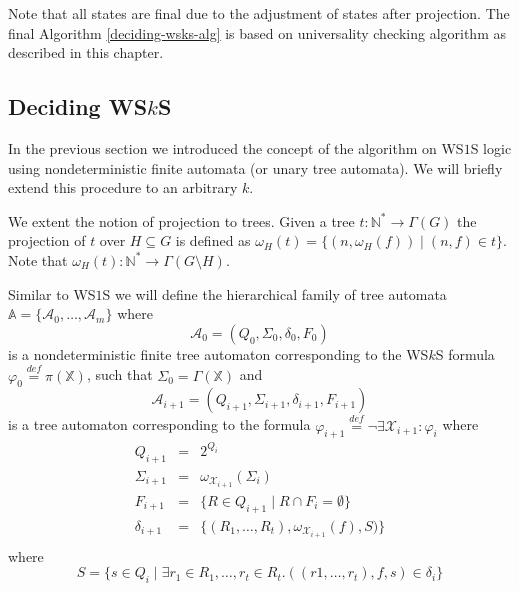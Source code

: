 Note that all states are final due to the adjustment of states after projection.
The final Algorithm \ref{deciding-wsks-alg} is based on universality checking
algorithm as described in this chapter.

%    

\subsection{Deciding WS$k$S}

In the previous section we introduced the concept of the algorithm on WS$1$S
logic using nondeterministic finite automata (or unary tree automata). We will
briefly extend this procedure to an arbitrary $k$.

We extent the notion of projection to trees. Given a tree $t :
\mathbb{N}^* \rightarrow \Gamma(G)$ the projection of $t$ over $H \subseteq G$
is defined as $\omega_H(t) = \{(n, \omega_H(f)) \mid (n, f) \in t\}$. Note that
$\omega_H(t) : \mathbb{N}^* \rightarrow \Gamma(G\setminus H)$.

Similar to WS$1$S we will define the hierarchical family of tree automata
$\mathbb{A} = \{\mathcal{A}_0,\ldots,\mathcal{A}_m\}$ where
\begin{equation}
 \mathcal{A}_0 = (Q_0, \Sigma_0, \delta_0, F_0)
\end{equation} is a nondeterministic finite tree automaton corresponding to the
WS$k$S formula $\varphi_0 \overset{\mathit{def}}{=} \pi(\mathbb{X})$, such that
$\Sigma_0 = \Gamma(\mathbb{X})$ and
\begin{equation}
 \mathcal{A}_{i+1} = (Q_{i+1}, \Sigma_{i+1}, \delta_{i+1}, F_{i+1})
\end{equation}
is a tree automaton corresponding to the formula $\varphi_{i+1}
\overset{\mathit{def}}{=} \neg\exists\mathcal{X}_{i+1}: \varphi_i$ where
\begin{eqnarray}
 Q_{i+1} & = & 2^{Q_i}\\
 \Sigma_{i+1} & = & \omega_{\mathcal{X}_{i+1}}(\Sigma_i)\\
 F_{i+1} & = & \{R \in Q_{i+1} \mid R \cap F_i = \emptyset\}\\
 \delta_{i+1} & = & \{(R_1,\ldots,R_t), \omega_{\mathcal{X}_{i+1}}(f), S)\}\\
\end{eqnarray}
where
\begin{equation}
S = \{s \in Q_i \mid \exists r_1 \in R_1,\ldots,r_t \in R_t.
 ((r1,\ldots,r_t), f, s) \in \delta_i\}
\end{equation}

